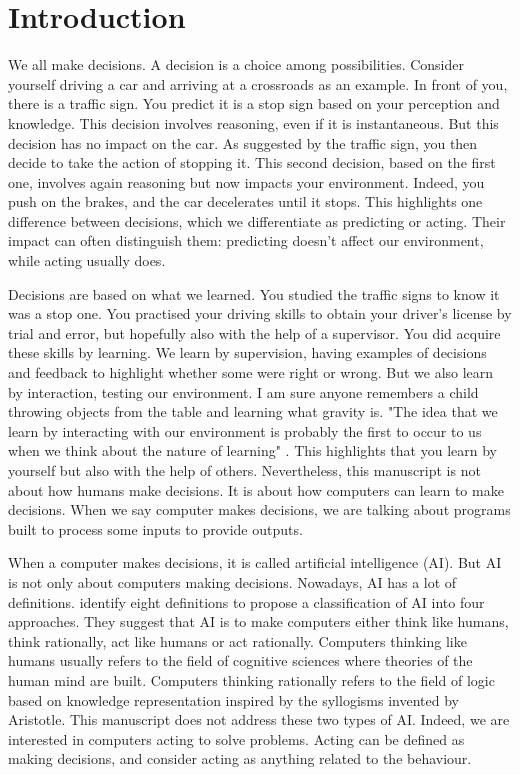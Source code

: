 \chapter{Introduction}\label{ch:introduction}

We all make decisions.
A decision is a choice among possibilities.
Consider yourself driving a car and arriving at a crossroads as an example.
In front of you, there is a traffic sign.
You predict it is a stop sign based on your perception and knowledge.
This decision involves reasoning, even if it is instantaneous.
But this decision has no impact on the car.
As suggested by the traffic sign, you then decide to take the action of stopping it.
This second decision, based on the first one, involves again reasoning but now impacts your environment.
Indeed, you push on the brakes, and the car decelerates until it stops.
This highlights one difference between decisions, which we differentiate as predicting or acting.
Their impact can often distinguish them: predicting doesn't affect our environment, while acting usually does.

Decisions are based on what we learned.
You studied the traffic signs to know it was a stop one.
You practised your driving skills to obtain your driver's license by trial and error, but hopefully also with the help of a supervisor.
You did acquire these skills by learning.
We learn by supervision, having examples of decisions and feedback to highlight whether some were right or wrong.
But we also learn by interaction, testing our environment.
I am sure anyone remembers a child throwing objects from the table and learning what gravity is.
"The idea that we learn by interacting with our environment is probably the first to occur to us when we think about the nature of learning" \citep{sutton2018reinforcement}.
This highlights that you learn by yourself but also with the help of others.
Nevertheless, this manuscript is not about how humans make decisions. 
It is about how computers can learn to make decisions.
When we say computer makes decisions, we are talking about programs built to process some inputs to provide outputs.

When a computer makes decisions, it is called artificial intelligence (AI).
But AI is not only about computers making decisions.
Nowadays, AI has a lot of definitions.
\cite{russel2010} identify eight definitions to propose a classification of AI into four approaches.
They suggest that AI is to make computers either think like humans, think rationally, act like humans or act rationally.
Computers thinking like humans usually refers to the field of cognitive sciences where theories of the human mind are built.
Computers thinking rationally refers to the field of logic based on knowledge representation inspired by the syllogisms invented by Aristotle.
This manuscript does not address these two types of AI.
Indeed, we are interested in computers acting to solve problems.
Acting can be defined as making decisions, and \cite{russel2010} consider acting as anything related to the behaviour.

